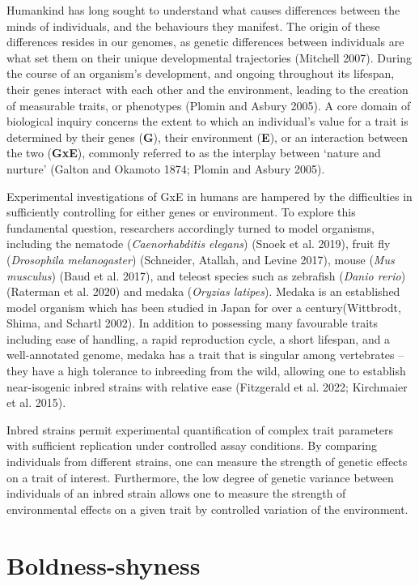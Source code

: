 \documentclass[
]{book}
\begin{document}
Humankind has long sought to understand what causes differences between the minds of individuals, and the behaviours they manifest. The origin of these differences resides in our genomes, as genetic differences between individuals are what set them on their unique developmental trajectories (Mitchell 2007). During the course of an organism's development, and ongoing throughout its lifespan, their genes interact with each other and the environment, leading to the creation of measurable traits, or phenotypes (Plomin and Asbury 2005). A core domain of biological inquiry concerns the extent to which an individual's value for a trait is determined by their genes (\textbf{G}), their environment (\textbf{E}), or an interaction between the two (\textbf{GxE}), commonly referred to as the interplay between `nature and nurture' (Galton and Okamoto 1874; Plomin and Asbury 2005).

Experimental investigations of GxE in humans are hampered by the difficulties in sufficiently controlling for either genes or environment. To explore this fundamental question, researchers accordingly turned to model organisms, including the nematode (\emph{Caenorhabditis elegans}) (Snoek et al. 2019), fruit fly (\emph{Drosophila melanogaster}) (Schneider, Atallah, and Levine 2017), mouse (\emph{Mus musculus}) (Baud et al. 2017), and teleost species such as zebrafish (\emph{Danio rerio}) (Raterman et al. 2020) and medaka (\emph{Oryzias latipes}). Medaka is an established model organism which has been studied in Japan for over a century(Wittbrodt, Shima, and Schartl 2002). In addition to possessing many favourable traits including ease of handling, a rapid reproduction cycle, a short lifespan, and a well-annotated genome, medaka has a trait that is singular among vertebrates -- they have a high tolerance to inbreeding from the wild, allowing one to establish near-isogenic inbred strains with relative ease (Fitzgerald et al. 2022; Kirchmaier et al. 2015).

Inbred strains permit experimental quantification of complex trait parameters with sufficient replication under controlled assay conditions. By comparing individuals from different strains, one can measure the strength of genetic effects on a trait of interest. Furthermore, the low degree of genetic variance between individuals of an inbred strain allows one to measure the strength of environmental effects on a given trait by controlled variation of the environment.

\hypertarget{boldness-shyness}{%
\section{Boldness-shyness}\label{boldness-shyness}}
\end{document}
